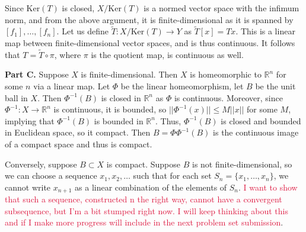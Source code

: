 \documentclass[aps,pra,showpacs,notitlepage,onecolumn,superscriptaddress,nofootinbib]{revtex4-1}
\newcommand{\pop}[1]{\textcolor{crimson}{#1}}
\theoremstyle{definition}
\begin{document}
Since $\text{Ker}(T)$ is closed, $X/\text{Ker}(T)$ is a normed vector space with the infimum norm, and from the above argument, it is finite-dimensional as it is spanned by $[f_1], \dots, [f_n]$.
Let us define $\widetilde{T} : X/\text{Ker}(T) \rightarrow Y$ as $\widetilde{T}[x] = Tx$. This is a linear map between finite-dimensional vector spaces, and is thus continuous. It follows that $T = \widetilde{T} \circ \pi$,
where $\pi$ is the quotient map, is continuous as well.
\newline

\noindent \textbf{Part C.} Suppose $X$ is finite-dimensional. Then $X$ is homeomorphic to $\mathbb{R}^{n}$ for some $n$ via a linear map. Let $\Phi$ be the linear homeomorphism, let $B$ be the
unit ball in $X$. Then $\Phi^{-1}(B)$ is closed in $\mathbb{R}^{n}$ as $\Phi$ is continuous. Moreover, since $\Phi^{-1} : X \rightarrow \mathbb{R}^{n}$ is continuous, it is bounded, so $||\Phi^{-1}(x)|| \leq M ||x||$
for some $M$, implying that $\Phi^{-1}(B)$ is bounded in $\mathbb{R}^{n}$. Thus, $\Phi^{-1}(B)$ is closed and bounded in Euclidean space, so it compact. Then $B = \Phi \Phi^{-1}(B)$ is the continuous image
of a compact space and thus is compact.

Conversely, suppose $B \subset X$ is compact. Suppose $B$ is not finite-dimensional, so we can choose a sequence $x_1, x_2, \dots$ such that for each set $S_n = \{x_1, \dots, x_n\}$, we cannot write $x_{n + 1}$ as a linear combination
of the elements of $S_n$. \pop{I want to show that such a sequence, constructed n the right way, cannot have a convergent subsequence, but I'm a bit stumped right now. I will keep thinking about this
  and if I make more progress will include in the next problem set submission}.
\end{document}
